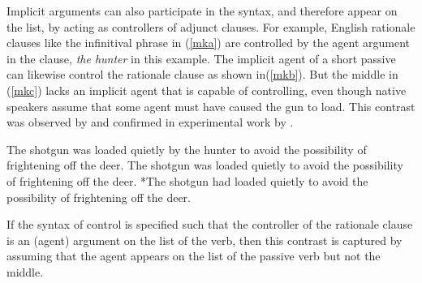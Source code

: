 \documentclass[output=paper]{langsci/langscibook}
\begin{document}
Implicit arguments can also participate in the syntax, and therefore appear on the \argst list, by acting as controllers of adjunct clauses.  For example, English  rationale clauses like the infinitival phrase in (\ref{mka}) are controlled by the agent argument in the clause, \textit{the hunter} in this 
example.  The implicit agent of a short passive can likewise control the rationale clause as shown in(\ref{mkb}).  But the middle in (\ref{mkc}) lacks an implicit agent that is capable of controlling, even though native speakers assume that some agent must have caused the gun to load.  This contrast was observed by \citet{KeyserandRoeper1984} and confirmed in experimental work by \citet{MaunerandKoenig2000}.  

\begin{exe}
\ex\label{mk}
\begin{xlist}
\ex\label{mka}
The shotgun was loaded quietly by the hunter
to avoid the possibility of frightening off the deer.
\ex\label{mkb}The shotgun was loaded quietly
to avoid the possibility of frightening off the deer.
\ex\label{mkc}*The shotgun had loaded quietly
to avoid the possibility of frightening off the deer.
\end{xlist}
\end{exe}



\noindent
If the syntax of control  is specified such that the controller of the rationale clause is an (agent) argument on the \argst list of the verb, then this contrast is captured by assuming that the agent appears on the \argst list of the passive verb but not the middle.
\end{document}
